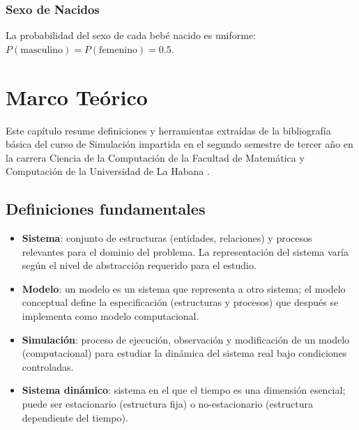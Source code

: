 \documentclass[12pt, a4paper, spanish]{report}
\begin{document}
\subsection{Sexo de Nacidos}

La probabilidad del sexo de cada bebé nacido es uniforme: $P(\text{masculino}) = P(\text{femenino}) = 0.5$.

\chapter{Marco Teórico}
\label{ch:marco_teorico}

Este capítulo resume definiciones y herramientas extraídas de la bibliografía básica del curso de Simulación impartida en el segundo semestre de tercer año en la carrera Ciencia de la Computación de la Facultad de Matemática y Computación de la Universidad de La Habana \cite{garcia2006}.

\section{Definiciones fundamentales}

\begin{itemize}
    \item \textbf{Sistema}: conjunto de estructuras (entidades, relaciones)
    y procesos relevantes para el dominio del problema. La representación
    del sistema varía según el nivel de abstracción requerido para el estudio.

    \item \textbf{Modelo}: un modelo es un sistema que representa a otro
    sistema; el modelo conceptual define la especificación (estructuras y
    procesos) que después se implementa como modelo computacional.

    \item \textbf{Simulación}: proceso de ejecución, observación y modificación
    de un modelo (computacional) para estudiar la dinámica del sistema real
    bajo condiciones controladas.

    \item \textbf{Sistema dinámico}: sistema en el que el tiempo es una
    dimensión esencial; puede ser estacionario (estructura fija) o
    no-estacionario (estructura dependiente del tiempo).
\end{itemize}
\end{document}
